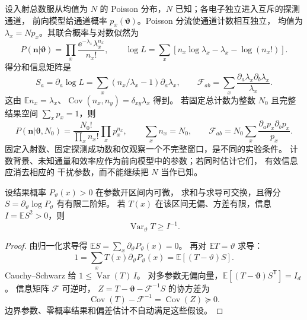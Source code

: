 \begin{definition}
设入射总数服从均值为 $N$ 的 Poisson 分布，$N$ 已知；各电子独立进入互斥的探测通道，
前向模型给通道概率 $p_x(\boldsymbol\vartheta)$。Poisson 分流使通道计数相互独立，
均值为 $\lambda_x=Np_x$。其联合概率与对数似然为
\begin{equation}
 P(\mathbf n|\boldsymbol\vartheta)=\prod_x\frac{\ee^{-\lambda_x}\lambda_x^{n_x}}{n_x!},\qquad
 \log L=\sum_x[n_x\log\lambda_x-\lambda_x-\log(n_x!)].
 \label{eq:feqo-count-likelihood}
\end{equation}
得分和信息矩阵是
\begin{equation}
 S_a=\partial_a\log L=\sum_x(n_x/\lambda_x-1)\partial_a\lambda_x,
 \qquad\mathcal F_{ab}=\sum_x\frac{\partial_a\lambda_x\partial_b\lambda_x}{\lambda_x}.
 \label{eq:feqo-poisson-fisher}
\end{equation}
这由 $\mathbb E n_x=\lambda_x$、$\operatorname{Cov}(n_x,n_y)=\delta_{xy}\lambda_x$ 得到。
若固定总计数为整数 $N_0$ 且完整结果空间 $\sum_xp_x=1$，则
\begin{equation}
 P(\mathbf n|\boldsymbol\vartheta,N_0)=\frac{N_0!}{\prod_xn_x!}\prod_xp_x^{n_x},\qquad
 \sum_xn_x=N_0,\qquad
 \mathcal F_{ab}=N_0\sum_x\frac{\partial_ap_x\partial_bp_x}{p_x}.
 \label{eq:feqo-multinomial}
\end{equation}
固定入射数、固定探测成功数和仅观察一个不完整窗口，是不同的实验条件。
计数背景、未知通量和效率应作为前向模型中的参数；若同时估计它们，
有效信息应消去相应的 干扰参数，而不能继续把 $N$ 当作已知。
\end{definition}

\begin{proposition}
\label{prop:cramer-rao}
设结果概率 $P_\vartheta(x)>0$ 在参数开区间内可微，
求和与求导可交换，且得分 $S=\partial_\vartheta\log P_\vartheta$ 有有限二阶矩。
若 $T(x)$ 在该区间无偏、方差有限，信息 $I=\mathbb E S^2>0$，则
\begin{equation}
\operatorname{Var}_\vartheta T\ge I^{-1}.
\label{eq:feqo-cr-bound}
\end{equation}
\end{proposition}
\begin{proof}
由归一化求导得 $\mathbb ES=\sum_x\partial_\vartheta P_\vartheta(x)=0$。
再对 $\mathbb ET=\vartheta$ 求导：
\[
1=\sum_x T(x)\partial_\vartheta P_\vartheta(x)
=\mathbb E[(T-\vartheta)S].
\]
Cauchy--Schwarz 给 $1\le\operatorname{Var}(T)\,I$。
对多参数无偏向量，$\mathbb E[(T-\boldsymbol\vartheta)S^{\mathsf T}]=I_d$。
信息矩阵 $\mathcal F$ 可逆时，
$Z=T-\boldsymbol\vartheta-\mathcal F^{-1}S$ 的协方差为
\begin{equation}
\operatorname{Cov}(T)-\mathcal F^{-1}=\operatorname{Cov}(Z)\succeq0.
\label{eq:feqo-cr-matrix}
\end{equation}
边界参数、零概率结果和偏差估计不自动满足这些假设。
\end{proof}

